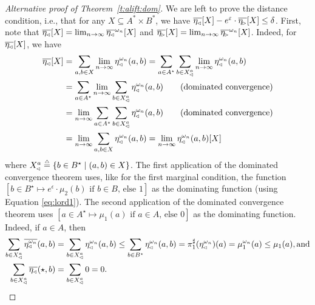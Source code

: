 \documentclass{lmcs}
\begin{document}
\begin{proof}[Alternative proof of Theorem~\ref{t:alift:dom}]
  We are left to prove the distance condition, i.e., that for any
  $X \subseteq A^* \times B^*$, we have
  $ \overline{\eta\lside}[X]
       - e^\epsilon \cdot \overline{\eta\rside}[X] \leq \delta $.
  First, note that
  $\overline{\eta\lside}[X]
     = \lim_{n \to \infty} \overline{\eta\lside}^{\omega_n}[X]$
  and
  $\overline{\eta\rside}[X]
     = \lim_{n \to \infty} \overline{\eta\rside}^{\omega_n}[X]$.
  Indeed, for $\overline{\eta\lside}[X]$, we have
  \begin{align*}
    \overline{\eta\lside}[X]
      &= \sum_{a, b \in X} \lim_{n \to \infty} \eta\lside^{\omega_n}(a, b)
       = \sum_{a \in A^\star} \sum_{b \in X\lside^a} \lim_{n \to \infty} \eta\lside^{\omega_n}(a, b) \\
      &= \sum_{a \in A^\star} \lim_{n \to \infty} \sum_{b \in X\lside^a} \eta\lside^{\omega_n}(a, b)
           \tag{dominated convergence} \\
      &= \lim_{n \to \infty} \sum_{a \in A^\star} \sum_{b \in X\lside^a} \eta\lside^{\omega_n}(a, b)
           \tag{dominated convergence} \\
      &= \lim_{n \to \infty} \sum_{a, b \in X} \eta\lside^{\omega_n}(a, b)
       = \lim_{n \to \infty} \eta\lside^{\omega_n}(a, b)[X]
  \end{align*}
  where $X\lside^a \eqdef \{ b \in B^\star \mid (a, b) \in X \}$.
  The first application of the dominated convergence theorem
  uses, like for the first marginal condition, the function
  $[b \in B^\star \mapsto \text{$e^\epsilon \cdot \mu_2(b)$ if $b \in B$, else $1$}]$
  as the dominating function (using Equation \eqref{eq:lord1}). The
  second application of the dominated convergence theorem uses
  $[a \in A^\star \mapsto \text{$\mu_1(a)$ if $a \in A$, else $0$}]$
  as the dominating function. Indeed, if $a \in A$, then
  \begin{align*}
    \sum_{b \in X\lside^a} \overline{\eta\lside^{\omega_n}}(a, b)
      &=    \sum_{b \in X\lside^a} \eta\lside^{\omega_n}(a, b)
       \leq \sum_{b \in B^\star} \eta\lside^{\omega_n}(a, b)
       =    \dfst(\eta\lside^{\omega_n})(a) = \mu_1^{\omega_n}(a) \leq \mu_1(a), \text{and}\\
    \sum_{b \in X\lside^a} \overline{\eta\lside}(\star, b)
      &= \sum_{b \in X\lside^a} 0 = 0 .
  \end{align*}

  \medskip


\end{proof}
\end{document}

